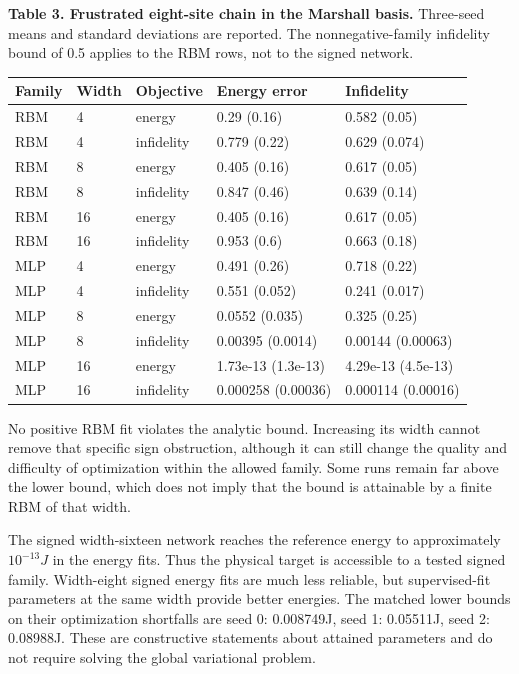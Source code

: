 \documentclass[
  11pt,
  a4paper,
]{article}
\begin{document}
\par\medskip
\noindent\begin{minipage}{\linewidth}

\textbf{Table 3. Frustrated eight-site chain in the Marshall basis.}
Three-seed means and standard deviations are reported. The
nonnegative-family infidelity bound of 0.5 applies to the RBM rows, not
to the signed network.

\begin{tabular}{@{}lllll@{}}
\toprule\noalign{}
Family & Width & Objective & Energy error & Infidelity \\
\midrule\noalign{}


RBM & 4 & energy & 0.29 (0.16) & 0.582 (0.05) \\
RBM & 4 & infidelity & 0.779 (0.22) & 0.629 (0.074) \\
RBM & 8 & energy & 0.405 (0.16) & 0.617 (0.05) \\
RBM & 8 & infidelity & 0.847 (0.46) & 0.639 (0.14) \\
RBM & 16 & energy & 0.405 (0.16) & 0.617 (0.05) \\
RBM & 16 & infidelity & 0.953 (0.6) & 0.663 (0.18) \\
MLP & 4 & energy & 0.491 (0.26) & 0.718 (0.22) \\
MLP & 4 & infidelity & 0.551 (0.052) & 0.241 (0.017) \\
MLP & 8 & energy & 0.0552 (0.035) & 0.325 (0.25) \\
MLP & 8 & infidelity & 0.00395 (0.0014) & 0.00144 (0.00063) \\
MLP & 16 & energy & 1.73e-13 (1.3e-13) & 4.29e-13 (4.5e-13) \\
MLP & 16 & infidelity & 0.000258 (0.00036) & 0.000114 (0.00016) \\
\bottomrule
\end{tabular}
\end{minipage}\par\medskip


No positive RBM fit violates the analytic bound. Increasing its width
cannot remove that specific sign obstruction, although it can still
change the quality and difficulty of optimization within the allowed
family. Some runs remain far above the lower bound, which does not imply
that the bound is attainable by a finite RBM of that width.

The signed width-sixteen network reaches the reference energy to
approximately \(10^{-13}J\) in the energy fits. Thus the physical target
is accessible to a tested signed family. Width-eight signed energy fits
are much less reliable, but supervised-fit parameters at the same width
provide better energies. The matched lower bounds on their optimization
shortfalls are seed 0: 0.008749J, seed 1: 0.05511J, seed 2: 0.08988J.
These are constructive statements about attained parameters and do not
require solving the global variational problem.
\end{document}
